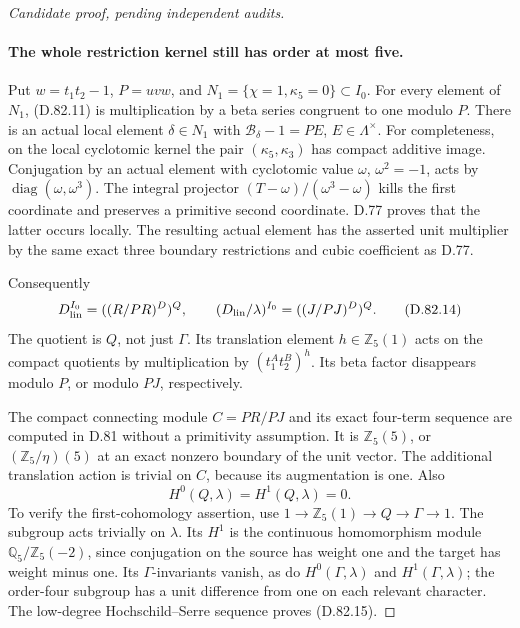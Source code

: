 \begin{proof}[Candidate proof, pending independent audits]
\paragraph{The whole restriction kernel still has order at most five.}
Put \(w=t_1t_2-1\), \(P=uvw\), and
\(N_1=\{\chi=1,\kappa_5=0\}\subset I_0\).
For every element of \(N_1\), (D.82.11) is multiplication
by a beta series congruent to one modulo \(P\).
There is an actual local element \(\delta\in N_1\) with
\(\mathcal B_\delta-1=P E\), \(E\in\Lambda^\times\).
For completeness, on the local cyclotomic kernel the pair
\((\kappa_5,\kappa_3)\) has compact additive image. Conjugation
by an actual element with cyclotomic value
\(\omega\), \(\omega^2=-1\), acts by
\(\operatorname{diag}(\omega,\omega^3)\).
The integral projector
\((T-\omega)/(\omega^3-\omega)\) kills the first coordinate
and preserves a primitive second coordinate. D.77 proves
that the latter occurs locally. The resulting actual element
has the asserted unit multiplier by the same exact three
boundary restrictions and cubic coefficient as D.77.

Consequently
\[
 D_{\rm lin}^{I_0}=((R/PR)^D)^Q,\qquad
 (D_{\rm lin}/\lambda)^{I_0}=((J/PJ)^D)^Q.
                                                               \tag{D.82.14}
\]
The quotient is \(Q\), not just \(\Gamma\).
Its translation element \(h\in\mathbb Z_5(1)\) acts on
the compact quotients by multiplication by
\((t_1^A t_2^B)^h\). Its beta factor disappears modulo
\(P\), or modulo \(PJ\), respectively.

The compact connecting module \(C=PR/PJ\) and its exact
four-term sequence are computed in D.81 without a
primitivity assumption. It is \(\mathbb Z_5(5)\), or
\((\mathbb Z_5/\eta)(5)\) at an exact nonzero boundary of the unit vector.
The additional translation action is trivial on \(C\),
because its augmentation is one.
Also
\[
                      H^0(Q,\lambda)=H^1(Q,\lambda)=0.
                                                               \tag{D.82.15}
\]
To verify the first-cohomology assertion, use
\(1\to\mathbb Z_5(1)\to Q\to\Gamma\to1\).
The subgroup acts trivially on \(\lambda\).
Its \(H^1\) is the continuous homomorphism module
\(\mathbb Q_5/\mathbb Z_5(-2)\), since conjugation on the
source has weight one and the target has weight minus one.
Its \(\Gamma\)-invariants vanish, as do
\(H^0(\Gamma,\lambda)\) and \(H^1(\Gamma,\lambda)\);
the order-four subgroup has a unit difference from one
on each relevant character. The low-degree
Hochschild--Serre sequence proves (D.82.15).


\end{proof}
